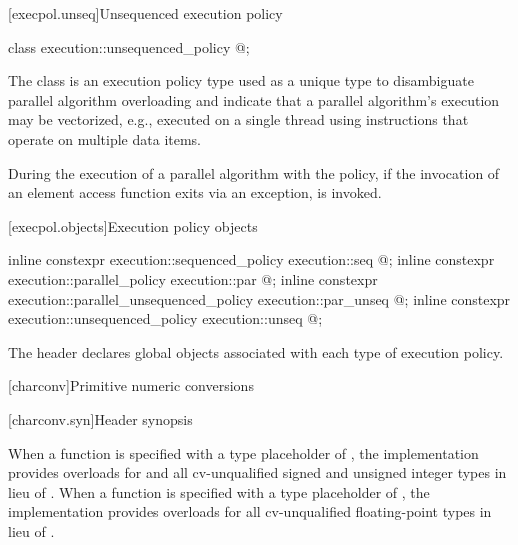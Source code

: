 [execpol.unseq]{Unsequenced execution policy}

%
\begin{itemdecl}
class execution::unsequenced_policy { @\unspec@ };
\end{itemdecl}

\begin{itemdescr}
\pnum
The class  is an execution policy type
used as a unique type to disambiguate parallel algorithm overloading and
indicate that a parallel algorithm's execution may be vectorized,
e.g., executed on a single thread using instructions
that operate on multiple data items.

\pnum
During the execution of a parallel algorithm with
the  policy,
if the invocation of an element access function exits via an exception,
 is invoked.
\end{itemdescr}

[execpol.objects]{Execution policy objects}

%
%
%
%
%
%
\begin{itemdecl}
inline constexpr execution::sequenced_policy            execution::seq{ @\unspec@ };
inline constexpr execution::parallel_policy             execution::par{ @\unspec@ };
inline constexpr execution::parallel_unsequenced_policy execution::par_unseq{ @\unspec@ };
inline constexpr execution::unsequenced_policy          execution::unseq{ @\unspec@ };
\end{itemdecl}

\begin{itemdescr}
\pnum
The header  declares global objects associated with each type of execution policy.
\end{itemdescr}

[charconv]{Primitive numeric conversions}

[charconv.syn]{Header  synopsis}

\pnum
When a function is specified
with a type placeholder of ,
the implementation provides overloads
for  and all cv-unqualified signed and unsigned integer types
in lieu of .
When a function is specified
with a type placeholder of ,
the implementation provides overloads
for all cv-unqualified floating-point types
in lieu of .

